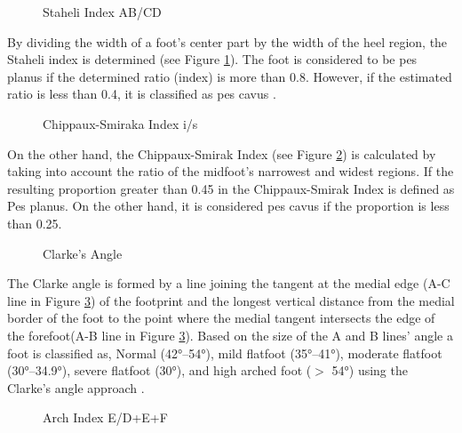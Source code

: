 \begin{figure}[htbp]
\centering
{}
\caption{Staheli Index AB/CD \cite{radiopaediamearysangle}}
\label{fig:MethodologyStaheliIndex}
\end{figure}

By dividing the width of a foot's center part by the width of the heel region, the Staheli index is determined (see Figure \ref{fig:MethodologyStaheliIndex}). The foot is considered to be pes planus if the determined ratio (index) is more than 0.8. However, if the estimated ratio is less than 0.4, it is classified as pes cavus \cite{almaawi2019flatfoot}.

\begin{figure}[htbp]
\centering
{}
\caption{Chippaux-Smiraka Index i/s \cite{radiopaediamearysangle}}
\label{fig:MethodologyChippauxSmirakaIndex}
\end{figure}

On the other hand, the Chippaux-Smirak Index (see Figure \ref{fig:MethodologyChippauxSmirakaIndex}) is calculated by taking into account the ratio of the midfoot's narrowest and widest regions. If the  resulting proportion greater than 0.45 in the Chippaux-Smirak Index is defined as Pes planus. On the other hand, it is considered pes cavus\cite{almaawi2019flatfoot} if the proportion is less than 0.25.

\begin{figure}[htbp]
\centering
{}
\caption{Clarke's Angle \cite{ozer2012evaluation}}
\label{fig:MethodologyClarkesAngle}
\end{figure}

The Clarke angle is formed by a line joining the tangent at the medial edge (A-C line in Figure \ref{fig:MethodologyClarkesAngle}) of the footprint and the longest vertical distance from the medial border of the foot to the point where the medial tangent intersects the edge of the forefoot(A-B line in Figure \ref{fig:MethodologyClarkesAngle}). Based on the size of the A and B lines’ angle a foot is classified as, Normal (42°–54°), mild flatfoot (35°–41°), moderate flatfoot (30°–34.9°), severe flatfoot (30°), and high arched foot ($>$ 54°) using the Clarke's angle approach \cite{hegazy2021comparing}.

\begin{figure}[htbp]
\centering
{}
\caption{Arch Index E/D+E+F \cite{ozer2012evaluation}}
\label{fig:MethodologyArchIndex}
\end{figure}


